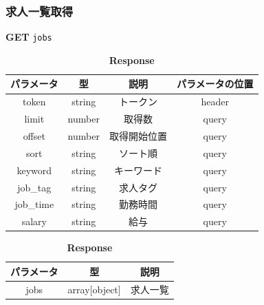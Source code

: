 \subsubsection*{求人一覧取得}
\textbf{GET} \texttt{jobs}
\begin{table}[H]
  \begin{minipage}
    {0.5\hsize} \centering \captionsetup{labelformat=empty,labelsep=none}
    \caption{\textbf{Request}}
    \small
    \begin{tabular}{|c|c|c|c|} \hline
      パラメータ     & 型      & 説明     & パラメータの位置 \\ \hline \hline
      token     & string & トークン   & header   \\ \hline
      limit     & number & 取得数    & query    \\ \hline
      offset    & number & 取得開始位置 & query    \\ \hline
      sort      & string & ソート順   & query    \\ \hline
      keyword   & string & キーワード  & query    \\ \hline
      job\_tag  & string & 求人タグ   & query    \\ \hline
      job\_time & string & 勤務時間   & query    \\ \hline
      salary    & string & 給与     & query    \\ \hline
    \end{tabular}
  \end{minipage}
  \begin{minipage}
    {0.5\hsize} \centering \captionsetup{labelformat=empty,labelsep=none}
    \caption{\textbf{Response}}
    \begin{tabular}{|c|c|c|} \hline
      パラメータ & 型             & 説明   \\ \hline \hline
      jobs  & array[object] & 求人一覧 \\ \hline
    \end{tabular}
  \end{minipage}
\end{table}

